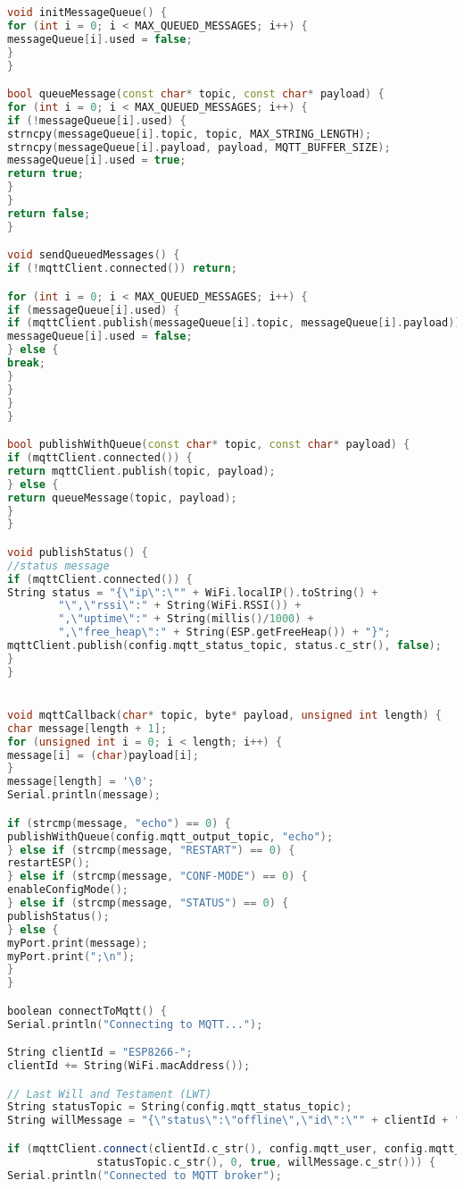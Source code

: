 \begin{lstlisting}[language=C++]
void initMessageQueue() {
for (int i = 0; i < MAX_QUEUED_MESSAGES; i++) {
messageQueue[i].used = false;
}
}

bool queueMessage(const char* topic, const char* payload) {
for (int i = 0; i < MAX_QUEUED_MESSAGES; i++) {
if (!messageQueue[i].used) {
strncpy(messageQueue[i].topic, topic, MAX_STRING_LENGTH);
strncpy(messageQueue[i].payload, payload, MQTT_BUFFER_SIZE);
messageQueue[i].used = true;
return true;
}
}
return false;
}

void sendQueuedMessages() {
if (!mqttClient.connected()) return;

for (int i = 0; i < MAX_QUEUED_MESSAGES; i++) {
if (messageQueue[i].used) {
if (mqttClient.publish(messageQueue[i].topic, messageQueue[i].payload)) {
messageQueue[i].used = false;
} else {
break; 
}
}
}
}

bool publishWithQueue(const char* topic, const char* payload) {
if (mqttClient.connected()) {
return mqttClient.publish(topic, payload);
} else {
return queueMessage(topic, payload);
}
}

void publishStatus() {
//status message
if (mqttClient.connected()) {
String status = "{\"ip\":\"" + WiFi.localIP().toString() + 
        "\",\"rssi\":" + String(WiFi.RSSI()) + 
        ",\"uptime\":" + String(millis()/1000) + 
        ",\"free_heap\":" + String(ESP.getFreeHeap()) + "}";
mqttClient.publish(config.mqtt_status_topic, status.c_str(), false);
}
}


void mqttCallback(char* topic, byte* payload, unsigned int length) {
char message[length + 1];
for (unsigned int i = 0; i < length; i++) {
message[i] = (char)payload[i];
}
message[length] = '\0';
Serial.println(message);

if (strcmp(message, "echo") == 0) {
publishWithQueue(config.mqtt_output_topic, "echo");
} else if (strcmp(message, "RESTART") == 0) {
restartESP();
} else if (strcmp(message, "CONF-MODE") == 0) {
enableConfigMode();
} else if (strcmp(message, "STATUS") == 0) {
publishStatus();
} else {
myPort.print(message);
myPort.print(";\n");
}
}

boolean connectToMqtt() {
Serial.println("Connecting to MQTT...");

String clientId = "ESP8266-";
clientId += String(WiFi.macAddress());

// Last Will and Testament (LWT)
String statusTopic = String(config.mqtt_status_topic);
String willMessage = "{\"status\":\"offline\",\"id\":\"" + clientId + "\"}";

if (mqttClient.connect(clientId.c_str(), config.mqtt_user, config.mqtt_password, 
              statusTopic.c_str(), 0, true, willMessage.c_str())) {
Serial.println("Connected to MQTT broker");


\end{lstlisting}
